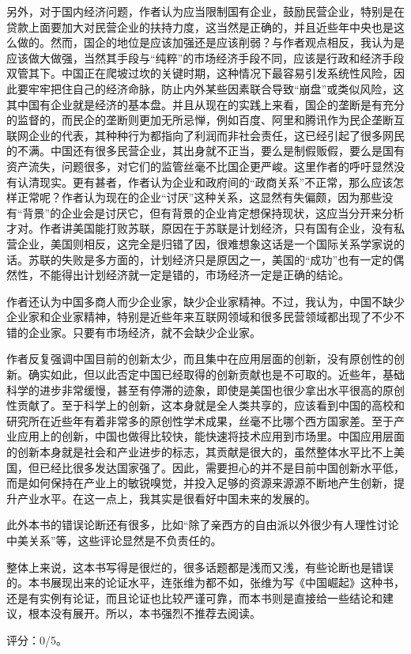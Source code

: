 另外，对于国内经济问题，作者认为应当限制国有企业，鼓励民营企业，特别是在贷款上面要加大对民营企业的扶持力度，这当然是正确的，并且近些年中央也是这么做的。然而，国企的地位是应该加强还是应该削弱？与作者观点相反，我认为是应该做大做强，当然其手段与“纯粹”的市场经济手段不同，应该是行政和经济手段双管其下。中国正在爬坡过坎的关键时期，这种情况下最容易引发系统性风险，因此要牢牢把住自己的经济命脉，防止内外某些因素联合导致“崩盘”或类似风险，这其中国有企业就是经济的基本盘。并且从现在的实践上来看，国企的垄断是有充分的监督的，而民企的垄断则更加无所忌惮，例如百度、阿里和腾讯作为民企垄断互联网企业的代表，其种种行为都指向了利润而非社会责任，这已经引起了很多网民的不满。中国还有很多民营企业，其出身就不正当，要么是制假贩假，要么是国有资产流失，问题很多，对它们的监管丝毫不比国企更严峻。这里作者的呼吁显然没有认清现实。更有甚者，作者认为企业和政府间的“政商关系”不正常，那么应该怎样正常呢？作者认为现在的企业“讨厌”这种关系，这显然有失偏颇，因为那些没有“背景”的企业会是讨厌它，但有背景的企业肯定想保持现状，这应当分开来分析才对。作者讲美国能打败苏联，原因在于苏联是计划经济，只有国有企业，没有私营企业，美国则相反，这完全是归错了因，很难想象这话是一个国际关系学家说的话。苏联的失败是多方面的，计划经济只是原因之一，美国的“成功”也有一定的偶然性，不能得出计划经济就一定是错的，市场经济一定是正确的结论。

作者还认为中国多商人而少企业家，缺少企业家精神。不过，我认为，中国不缺少企业家和企业家精神，特别是近些年来互联网领域和很多民营领域都出现了不少不错的企业家。只要有市场经济，就不会缺少企业家。

作者反复强调中国目前的创新太少，而且集中在应用层面的创新，没有原创性的创新。确实如此，但以此否定中国已经取得的创新贡献也是不可取的。近些年，基础科学的进步非常缓慢，甚至有停滞的迹象，即使是美国也很少拿出水平很高的原创性贡献了。至于科学上的创新，这本身就是全人类共享的，应该看到中国的高校和研究所在近些年有着非常多的原创性学术成果，丝毫不比哪个西方国家差。至于产业应用上的创新，中国也做得比较快，能快速将技术应用到市场里。中国应用层面的创新本身就是社会和产业进步的标志，其贡献是很大的，虽然整体水平比不上美国，但已经比很多发达国家强了。因此，需要担心的并不是目前中国创新水平低，而是如何保持在产业上的敏锐嗅觉，并投入足够的资源来源源不断地产生创新，提升产业水平。在这一点上，我其实是很看好中国未来的发展的。

此外本书的错误论断还有很多，比如“除了亲西方的自由派以外很少有人理性讨论中美关系”等，这些评论显然是不负责任的。

整体上来说，这本书写得是很烂的，很多话题都是浅而又浅，有些论断也是错误的。本书展现出来的论证水平，连张维为都不如，张维为写《中国崛起》这种书，还是有实例有论证，而且论证也比较严谨可靠，而本书则是直接给一些结论和建议，根本没有展开。所以，本书强烈不推荐去阅读。

评分：0/5。

